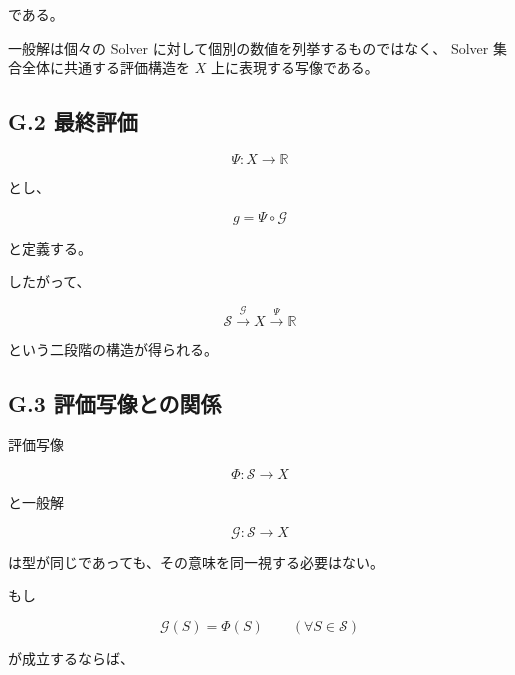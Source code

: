 \documentclass[a4paper,11pt]{article}
\newcommand{\Solver}{\mathcal{S}}
\newcommand{\R}{\mathbb{R}}
\newcommand{\Eval}{\mathcal{G}}
\newcommand{\EvalMap}{\Psi}
\begin{document}
である。

一般解は個々の Solver に対して個別の数値を列挙するものではなく、
Solver 集合全体に共通する評価構造を $X$ 上に表現する写像である。


\subsection{G.2 最終評価}

\begin{equation}
    \EvalMap:X\to\R
\end{equation}

とし、

\begin{equation}
    g
    =
    \EvalMap\circ\Eval
\end{equation}

と定義する。

したがって、

\begin{equation}
    \boxed{
        \Solver
        \xrightarrow{\Eval}
        X
        \xrightarrow{\EvalMap}
        \R
    }
\end{equation}

という二段階の構造が得られる。


\subsection{G.3 評価写像との関係}

評価写像

\begin{equation}
    \Phi:\Solver\to X
\end{equation}

と一般解

\begin{equation}
    \Eval:\Solver\to X
\end{equation}

は型が同じであっても、その意味を同一視する必要はない。

もし

\begin{equation}
    \Eval(S)=\Phi(S)
    \qquad
    (\forall S\in\Solver)
\end{equation}

が成立するならば、
\end{document}
